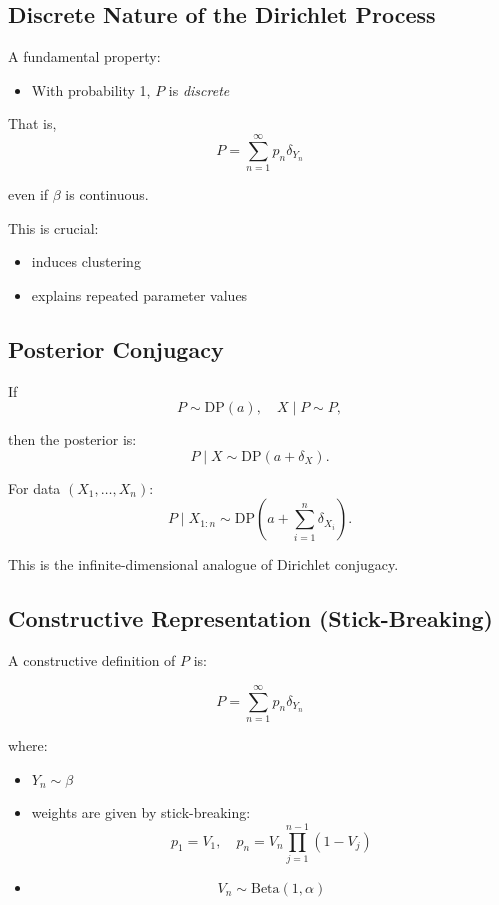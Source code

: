 \documentclass[12pt,oneside]{book}
\numberwithin{equation}{section}
\theoremstyle{definition}
\theoremstyle{plain}
\theoremstyle{remark}
\begin{document}
\subsection*{Discrete Nature of the Dirichlet Process}

A fundamental property:

\begin{itemize}
\item With probability 1, $P$ is \emph{discrete}
\end{itemize}

That is,
\[
P = \sum_{n=1}^{\infty} p_n \delta_{Y_n}
\]

even if $\beta$ is continuous.

This is crucial:
\begin{itemize}
\item induces clustering
\item explains repeated parameter values
\end{itemize}

\subsection*{Posterior Conjugacy}

If
\[
P \sim \mathrm{DP}(a), \quad X \mid P \sim P,
\]

then the posterior is:
\[
P \mid X \sim \mathrm{DP}(a + \delta_X).
\]

For data $(X_1, \dots, X_n)$:
\[
P \mid X_{1:n} \sim \mathrm{DP}\left(a + \sum_{i=1}^n \delta_{X_i}\right).
\]

This is the infinite-dimensional analogue of Dirichlet conjugacy.

\subsection*{Constructive Representation (Stick-Breaking)}

A constructive definition of $P$ is:

\[
P = \sum_{n=1}^{\infty} p_n \delta_{Y_n}
\]

where:
\begin{itemize}
\item $Y_n \sim \beta$
\item weights are given by stick-breaking:
\[
p_1 = V_1,\quad
p_n = V_n \prod_{j=1}^{n-1} (1 - V_j)
\]
\item
\[
V_n \sim \mathrm{Beta}(1, \alpha)
\]
\end{itemize}
\end{document}
